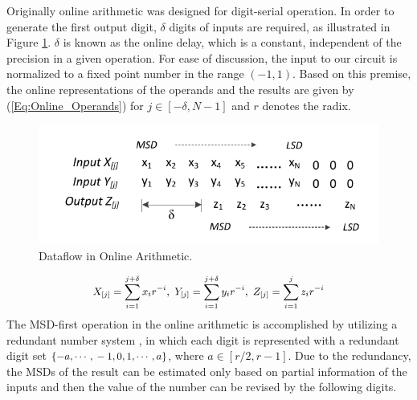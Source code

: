 \documentclass{acm_proc_article-sp}
\begin{document}
Originally online arithmetic was designed for digit-serial operation. In order to generate the first output digit, $\delta$ digits of inputs are required, as illustrated in Figure \ref{Fig:OnlineDataFlow}. $\delta$ is known as the online delay, which is a constant, independent of the precision in a given operation. For ease of discussion, the input to our circuit is normalized to a fixed point number in the range $(-1,1)$. Based on this premise, the online representations of the operands and the results are given by (\ref{Eq:Online_Operands}) \cite{Ercegovac_Book} for $j\in[-\delta,N-1]$ and $r$ denotes the radix.
\vspace{-1ex}
%
\begin{figure}[htbp]
  \centering
  \vspace{-2.5ex}
  \includegraphics[width=.46\textwidth]{./Figures/OnlineArithmetic_DataFlow.pdf}
  \vspace{-3ex}
  \caption{Dataflow in Online Arithmetic.}
  \label{Fig:OnlineDataFlow}
\end{figure}
%
\begin{eqnarray}\label{Eq:Online_Operands}
\footnotesize
  X_{[j]}=\sum_{i=1}^{j+\delta}x_ir^{-i},~Y_{[j]}=\sum_{i=1}^{j+\delta}y_ir^{-i},~Z_{[j]}=\sum_{i=1}^{j}z_ir^{-i}
\normalsize
\end{eqnarray}
%
The MSD-first operation in the online arithmetic is accomplished by utilizing a redundant number system \cite{RedundantNumber}, in which each digit is represented with a redundant digit set $\{-a, \cdots,\\-1, 0, 1, \cdots, a\}$, where $a\in[r/2,r-1]$. Due to the redundancy, the MSDs of the result can be estimated only based on partial information of the inputs and then the value of the number can be revised by the following digits.
\end{document}
